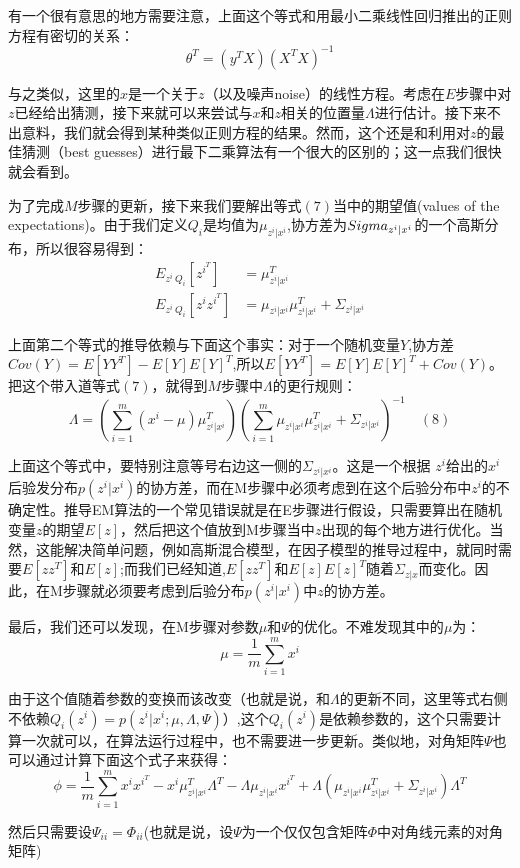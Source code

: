 \documentclass[14pt,a4paper]{article}
\begin{document}
\begin{spacing}{1.5}
有一个很有意思的地方需要注意，上面这个等式和用最小二乘线性回归推出的正则方程有密切的关系：
$$\theta^{T}=(y^{T}X)(X^{T}X)^{-1}$$

与之类似，这里的$x$是一个关于$z$（以及噪声noise）的线性方程。考虑在$E$步骤中对$z$已经给出猜测，接下来就可以来尝试与$x$和$z$相关的位置量$\Lambda$进行估计。接下来不出意料，我们就会得到某种类似正则方程的结果。然而，这个还是和利用对$z$的最佳猜测（best guesses）进行最下二乘算法有一个很大的区别的；这一点我们很快就会看到。

为了完成$M$步骤的更新，接下来我们要解出等式$(7)$当中的期望值(values of the expectations)。由于我们定义$Q_{i}$是均值为$\mu_{z^{i}|x^{i}}$,协方差为$\\Sigma_{z^{i}|x^{i}}$的一个高斯分布，所以很容易得到：
$$
\begin{aligned}
E_{z^{i}~Q_{i}}[z^{i^{T}}]&=\mu^{T}_{z^{i}|x^{i}}\\
E_{z^{i}~Q_{i}}[z^{i}z^{i^{T}}]&=\mu_{z^{i}|x^{i}}\mu^{T}_{z^{i}|x^{i}}+\Sigma_{z^{i}|x^{i}}
\end{aligned}
$$

上面第二个等式的推导依赖与下面这个事实：对于一个随机变量$Y$,协方差$Cov(Y)=E[YY^{T}]-E[Y]E[Y]^{T}$,所以$E[YY^{T}]=E[Y]E[Y]^T+Cov(Y)$。把这个带入道等式$(7)$，就得到$M$步骤中$\Lambda$的更行规则：
$$
\Lambda=(\sum_{i=1}^{m}(x^{i}-\mu)\mu^{T}_{z^{i}|x^{i}})(\sum_{i=1}^{m}\mu_{z^{i}|x^{i}}\mu_{z^{i}|x^{i}}^{T}+\Sigma_{z^{i}|x^{i}})^{-1} \quad (8)
$$

上面这个等式中，要特别注意等号右边这一侧的$\Sigma_{z^{i}|x^{i}}$。这是一个根据
$z^{i}$给出的$x^{i}$后验发分布$p(z^{i}|x^{i})$的协方差，而在M步骤中必须考虑到在这个后验分布中$z^{i}$的不确定性。推导EM算法的一个常见错误就是在E步骤进行假设，只需要算出在随机变量$z$的期望$E[z]$，然后把这个值放到M步骤当中$z$出现的每个地方进行优化。当然，这能解决简单问题，例如高斯混合模型，在因子模型的推导过程中，就同时需要$E[zz^{T}]$和$E[z]$;而我们已经知道,$E[zz^{T}]$和$E[z]E[z]^{T}$随着$\Sigma_{z|x}$而变化。因此，在M步骤就必须要考虑到后验分布$p(z^{i}|x^{i})$中$z$的协方差。

最后，我们还可以发现，在M步骤对参数$\mu$和$\Psi$的优化。不难发现其中的$\mu$为：
$$
\mu=\frac{1}{m}\sum_{i=1}^{m}x^{i}
$$

由于这个值随着参数的变换而该改变（也就是说，和$\Lambda$的更新不同，这里等式右侧不依赖$Q_{i}(z^{i})=p(z^{i}|x^{i};\mu,\Lambda,\Psi)$）,这个$Q_i(z^{i})$是依赖参数的，这个只需要计算一次就可以，在算法运行过程中，也不需要进一步更新。类似地，对角矩阵$\Psi$也可以通过计算下面这个式子来获得：
$$
\phi=\frac{1}{m}\sum_{i=1}^{m}x^{i}x^{i^{T}}-x^{i}\mu_{z^{i}|x^{i}}^T\Lambda^{T}-\Lambda\mu_{z^{i}|x^{i}}x^{i^{T}}+\Lambda(\mu_{z^{i}|x^{i}}\mu_{z^{i}|x^{i}}^{T}+\Sigma_{z^{i}|x^{i}})\Lambda^{T}
$$

然后只需要设$\Psi_{ii}=\Phi_{ii}$(也就是说，设$\Psi$为一个仅仅包含矩阵$\Phi$中对角线元素的对角矩阵)
\end{spacing}
\end{document}
